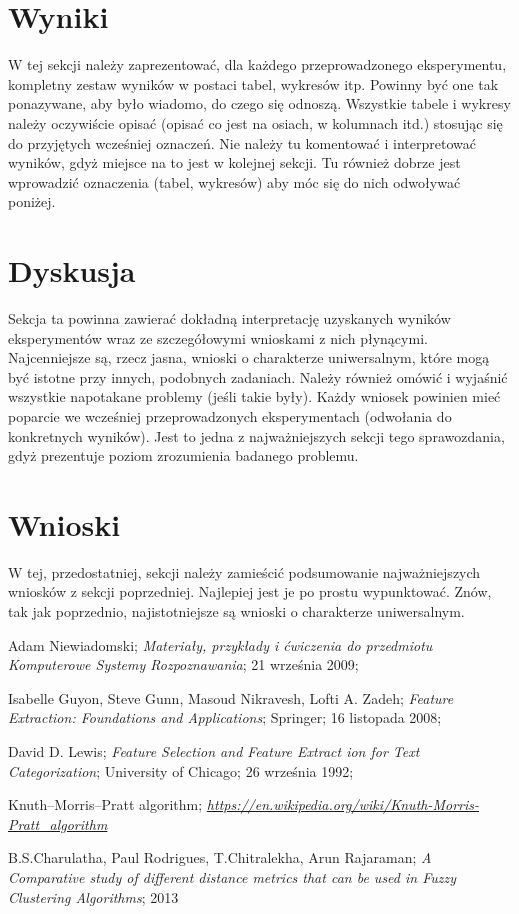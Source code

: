 \documentclass{classrep}
\begin{document}
\section{Wyniki}
{\color{blue}
W tej sekcji należy zaprezentować, dla każdego przeprowadzonego eksperymentu,
kompletny zestaw wyników w postaci tabel, wykresów itp. Powinny być one tak
ponazywane, aby było wiadomo, do czego się odnoszą. Wszystkie tabele i wykresy
należy oczywiście opisać (opisać co jest na osiach, w kolumnach itd.) stosując
się do przyjętych wcześniej oznaczeń. Nie należy tu komentować i interpretować
wyników, gdyż miejsce na to jest w kolejnej sekcji. Tu również dobrze jest
wprowadzić oznaczenia (tabel, wykresów) aby móc się do nich odwoływać
poniżej.}

\section{Dyskusja}
{\color{blue}
Sekcja ta powinna zawierać dokładną interpretację uzyskanych wyników
eksperymentów wraz ze szczegółowymi wnioskami z nich płynącymi. Najcenniejsze
są, rzecz jasna, wnioski o charakterze uniwersalnym, które mogą być istotne
przy innych, podobnych zadaniach. Należy również omówić i wyjaśnić wszystkie
napotakane problemy (jeśli takie były). Każdy wniosek powinien mieć poparcie
we wcześniej przeprowadzonych eksperymentach (odwołania do konkretnych
wyników). Jest to jedna z najważniejszych sekcji tego sprawozdania, gdyż
prezentuje poziom zrozumienia badanego problemu.}
\section{Wnioski}
{\color{blue}W tej, przedostatniej, sekcji należy zamieścić podsumowanie
najważniejszych wniosków z sekcji poprzedniej. Najlepiej jest je po prostu
wypunktować. Znów, tak jak poprzednio, najistotniejsze są wnioski o
charakterze uniwersalnym.}


\begin{thebibliography}{0}

 Adam Niewiadomski;
\textsl{Materiały, przykłady i ćwiczenia do przedmiotu
Komputerowe Systemy Rozpoznawania}; 21 września 2009;

 Isabelle Guyon, Steve Gunn, Masoud Nikravesh, Lofti A. Zadeh;
\textsl{Feature Extraction: Foundations and Applications}; Springer; 16 listopada 2008;

 David D. Lewis;
\textsl{Feature Selection and Feature Extract ion for Text Categorization}; University of Chicago; 26 września 1992;

 Knuth–Morris–Pratt algorithm;
\textsl{\url{https://en.wikipedia.org/wiki/Knuth-Morris-Pratt_algorithm}}

 B.S.Charulatha, Paul Rodrigues, T.Chitralekha, Arun Rajaraman;
\textsl{A Comparative study of different distance metrics that can be used in Fuzzy Clustering Algorithms}; 2013

\end{thebibliography}
\end{document}
